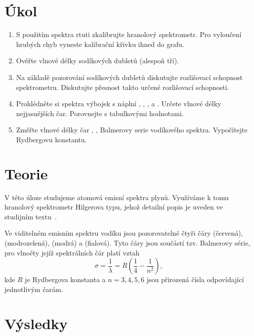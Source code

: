 \documentclass{protokol}
\begin{document}
    \section*{Úkol}

    \begin{enumerate}

        \item S použitím spektra rtuti zkalibrujte hranolový spektrometr.
        Pro vyloučení hrubých chyb vyneste kalibrační křivku ihned do grafu.
        \item Ověřte vlnové délky sodíkových dubletů (alespoň tří).
        \item Na základě pozorování sodíkových dubletů diskutujte rozlišovací schopnost spektrometru.
        Diskutujte přesnost takto určené rozlišovací schopnosti.
        \item Prohlédněte si spektra výbojek s náplní , , ,  a .
        Určete vlnové délky nejjasnějších čar.
        Porovnejte s tabulkovými hodnotami.
        \item Změřte vlnové délky čar , ,  Balmerovy serie vodíkového spektra.
        Vypočítejte Rydbergovu konstantu.

    \end{enumerate}

    \section*{Teorie}

    V této úloze studujeme atomová emisní spektra plynů.
    Využíváme k tomu hranolový spektrometr Hilgerova typu, jehož detailní popis je uveden ve studijním textu~\cite{pokyny}.

    Ve viditelném emisním spektru vodíku jsou pozorovatelné čtyři čáry  (červená),  (modrozelená),  (modrá) a  (fialová).
    Tyto čáry jsou součástí tzv. Balmerovy série, pro vlnočty jejíž spektrálních čár platí vztah
    \begin{equation} \label{eq:rydberg}
        \sigma = \frac{1}{\lambda} = R \left( \frac{1}{4} - \frac{1}{n^2} \right),
    \end{equation}
    kde $R$ je Rydbergova konstanta a $n = 3, 4, 5, 6$ jsou přirozená čísla odpovídající jednotlivým čarám.



    \section*{Výsledky}
\end{document}
